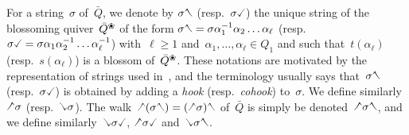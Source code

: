 \documentclass{amsart}
\theoremstyle{definition}
\newcommand{\darkblue}{\color{darkblue}} %
\newcommand{\defn}[1]{\textsl{\darkblue #1}} %
\newcommand{\quiver}{\bar Q} %
\newcommand{\blossom}{^\text{\ding{96}}} %
\newcommand{\hL}{\text{\rotatebox[origin=c]{180}{\checked}}}
\newcommand{\hR}{\text{\rotatebox[origin=c]{180}{\reflectbox{\checked}}}}
\newcommand{\cL}{\text{\reflectbox{\checked}}}
\newcommand{\cR}{\text{\checked}}
\newcommand{\hh}[1]{\hL#1\hR} %
\newcommand{\cc}[1]{\cL#1\cR} %
\newcommand{\hc}[1]{\hL#1\cR} %
\newcommand{\ch}[1]{\cL#1\hR} %
\begin{document}
For a string~$\sigma$ of~$\quiver$, we denote by $\sigma\hR$ (resp.~$\sigma\cR$) the unique string of the blossoming quiver~$\quiver\blossom$ of the form $\sigma\hR = \sigma \alpha_1^{-1} \alpha_2 \dots \alpha_\ell$ (resp.~$\sigma\cR = \sigma \alpha_1 \alpha_2^{-1} \dots \alpha_\ell^{-1}$) with~$\ell \ge 1$ and~${\alpha_1, \dots, \alpha_\ell \in Q_1}$ and such that~$t(\alpha_\ell)$ (resp.~$s(\alpha_\ell)$) is a blossom of~$\quiver\blossom$.
These notations are motivated by the representation of strings used in~\cite{ButlerRingel, PaluPilaudPlamondon-nonkissing}, and the terminology usually says that~$\sigma\hR$ (resp.~$\sigma\cR$) is obtained by adding a \defn{hook} (resp.~\defn{cohook}) to~$\sigma$.
We define similarly~$\hL\sigma$ (resp.~$\cL\sigma$).
The walk~$\hL(\sigma\hR) = (\hL\sigma)\hR$ of~$\quiver$ is simply be denoted~$\hh{\sigma}$, and we define similarly~$\cc{\sigma}$, $\hc{\sigma}$ and~$\ch{\sigma}$.
\end{document}
